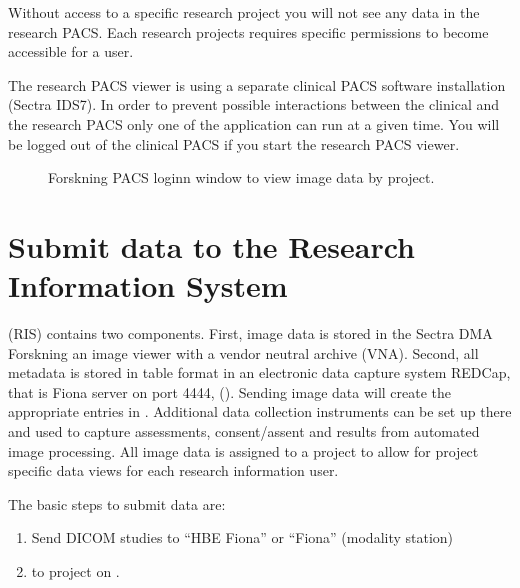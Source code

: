 \documentclass[letterpaper,10pt,english]{sphinxmanual}
\begin{document}
\sphinxAtStartPar
Without access to a specific research project you will not see any data in the research PACS. Each research projects requires specific permissions to become accessible for a user.

\sphinxAtStartPar
The research PACS viewer is using a separate clinical PACS software installation (Sectra IDS7). In order to prevent possible interactions between the clinical and the research PACS only one of the application can run at a given time. You will be logged out of the clinical PACS if you start the research PACS viewer.

\begin{figure}[htbp]
\centering
\capstart

\noindent{}
\caption{Forskning PACS log\sphinxhyphen{}inn window to view image data by project.}\label{\detokenize{EndUser/index:id2}}\end{figure}


\section{Submit data to the Research Information System}
\label{\detokenize{EndUser/index:submit-data-to-the-research-information-system}}
\sphinxAtStartPar
{} (RIS) contains two components. First, image data is stored in the Sectra DMA Forskning \sphinxhyphen{} an image viewer with a vendor neutral archive (VNA). Second, all meta\sphinxhyphen{}data is stored in table format in an electronic data capture system REDCap, that is Fiona server on port 4444, (). Sending image data will create the appropriate entries in . Additional data collection instruments can be set up there and used to capture assessments, consent/assent and results from automated image processing. All image data is assigned to a project to allow for project specific data views for each research information user.

\sphinxAtStartPar
The basic steps to submit data are:
\begin{enumerate}
%
\item {} 
\sphinxAtStartPar
Send DICOM studies to “HBE Fiona” or “Fiona” (modality station)

\item {} 
\sphinxAtStartPar
{} to project on .

\end{enumerate}
\end{document}
